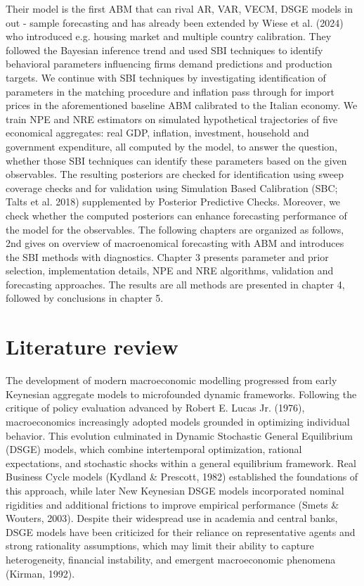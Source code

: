 \documentclass[12pt]{article}
\begin{document}
Their model is the first ABM that can rival AR, VAR, VECM, DSGE models in out - sample forecasting and has already been extended by Wiese et al. (2024) who introduced e.g. housing market and multiple country calibration. They followed the Bayesian inference trend and used SBI techniques to identify behavioral parameters influencing firms demand predictions and production targets. We continue with SBI techniques by investigating identification of parameters in the matching procedure and inflation pass through for import prices in the aforementioned baseline ABM calibrated to the Italian economy. We  train NPE and NRE estimators on simulated hypothetical trajectories of five economical aggregates: real GDP, inflation, investment, household and government expenditure, all computed by the model, to answer the question, whether those SBI techniques can identify these parameters based on the given observables. The resulting posteriors are checked for identification using sweep coverage checks and for validation using Simulation Based Calibration (SBC; Talts et al. 2018) supplemented by Posterior Predictive Checks. Moreover, we check whether the computed posteriors can enhance forecasting performance of the model for the observables. The following chapters are organized as follows, 2nd gives on overview of macroenomical forecasting with ABM and introduces the SBI methods with diagnostics. Chapter 3 presents parameter and prior selection, implementation details, NPE and NRE algorithms, validation and forecasting approaches. The results are all methods are presented in chapter 4, followed by conclusions in chapter 5.

\section{Literature review}
The development of modern macroeconomic modelling progressed from early Keynesian aggregate models to microfounded dynamic frameworks. Following the critique of policy evaluation advanced by Robert E. Lucas Jr. (1976), macroeconomics increasingly adopted models grounded in optimizing individual behavior. This evolution culminated in Dynamic Stochastic General Equilibrium (DSGE) models, which combine intertemporal optimization, rational expectations, and stochastic shocks within a general equilibrium framework. Real Business Cycle models (Kydland \& Prescott, 1982) established the foundations of this approach, while later New Keynesian DSGE models incorporated nominal rigidities and additional frictions to improve empirical performance (Smets \& Wouters, 2003). Despite their widespread use in academia and central banks, DSGE models have been criticized for their reliance on representative agents and strong rationality assumptions, which may limit their ability to capture heterogeneity, financial instability, and emergent macroeconomic phenomena (Kirman, 1992).
\end{document}
